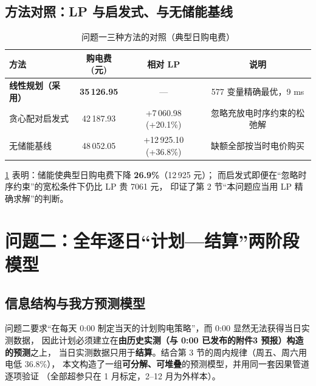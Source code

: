 \documentclass[12pt,a4paper,fontset=fandol]{ctexart}
\begin{document}
\subsection{方法对照\nobreak：LP 与启发式\nobreak、与无储能基线}

\begin{table}[htbp]
\centering
\caption{问题一三种方法的对照（典型日购电费\nobreak）}
\label{tab:q1cmp}
\begin{tabular}{@{}lccc@{}}
\toprule
方法 & 购电费(元) & 相对 LP & 说明 \\
\midrule
\textbf{线性规划（采用\nobreak）} & \textbf{35\,126.95} & --- & 577 变量精确最优\nobreak，9 ms \\
贪心配对启发式 & 42\,187.93 & +7\,060.98 (+20.1\%) & 忽略充放电时序约束的松弛解 \\
无储能基线 & 48\,052.05 & +12\,925.10 (+36.8\%) & 缺额全部按当时电价购买 \\
\bottomrule
\end{tabular}
\end{table}

\cref{tab:q1cmp} 表明\nobreak：储能使典型日购电费下降 \textbf{26.9\%}（12\,925 元\nobreak）\nobreak；
而启发式即便在“忽略时序约束\nobreak”的宽松条件下仍比 LP 贵 7061 元\nobreak，
印证了第 2 节“本问题应当用 LP 精确求解\nobreak”的判断\nobreak。


\section{问题二\nobreak：全年逐日“计划—结算\nobreak”两阶段模型}
\label{sec:q2}

\subsection{信息结构与我方预测模型}

问题二要求“在每天 0:00 制定当天的计划购电策略\nobreak”\nobreak，而 0:00 显然无法获得当日实测数据\nobreak，
因此计划必须建立在\textbf{由历史实测（与 0:00 已发布的附件3 预报\nobreak）构造的预测}之上\nobreak，
当日实测数据只用于\textbf{结算}\nobreak。结合第 3 节的周内规律（周五\nobreak、周六用电低 36.8\%\nobreak）\nobreak，
本文构造了一组\textbf{可分解\nobreak、可堆叠}的预测模型\nobreak，并用同一套因果管道逐项验证
（全部超参只在 1 月标定\nobreak，2--12 月为外样本\nobreak）\nobreak。
\end{document}

